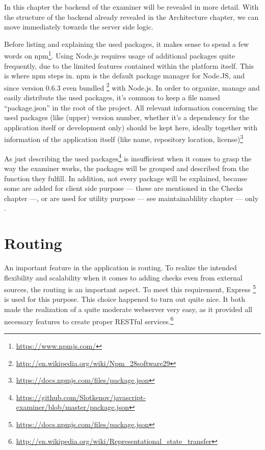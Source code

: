 In this chapter the backend of the \gls{examiner} will be revealed in more 
detail. With the structure of the backend already revealed in the Architecture 
chapter, we can move immediately towards the server side logic.

Before listing and explaining the used packages, it makes sense to spend a few 
words on npm\footnote{\url{https://www.npmjs.com/}}. Using Node.js requires
usage of additional packages quite frequently, due to the limited
features contained within the platform itself. This is where npm steps in. npm
is the default package manager for Node.JS, and since version 0.6.3 even bundled
\footnote{\url{http://en.wikipedia.org/wiki/Npm_28software29}} with Node.js.
In order to organize, manage and easily distribute the used packages, it's
common to keep a file named ``package.json'' in the root of the project. All 
relevant information concerning the used packages (like (upper) version number,
whether it's a dependency for the application itself or development only) should 
be kept here, ideally together with information of the application 
itself (like name, repository location,
license)\footnote{\url{https://docs.npmjs.com/files/package.json}}

As just describing the used 
packages\footnote{\url{https://github.com/Slotkenov/javascript-examiner/blob/master/package.json}}
is insufficient when it comes to grasp the way the \gls{examiner} works, the 
packages will be grouped and described from the function they fulfill. In
addition, not every package will be explained, because some are added for client
side purpose --- these are mentioned in the Checks chapter ---, 
or are used for utility purpose --- see maintainablility chapter --- only .

\section{Routing}
An important feature in the application is routing. To realize the intended
flexibility and scalability when it comes to adding \glspl{check} even from
external sources, the routing is an important aspect. To meet this requirement,
Express \footnote{\url{https://docs.npmjs.com/files/package.json}} is used for
this purpose. This choice happened to turn out quite nice. It both made the
realization of a quite moderate webserver very easy, as it provided all
necessary features to create proper RESTful
services.\footnote{\url{http://en.wikipedia.org/wiki/Representational_state_transfer}}

